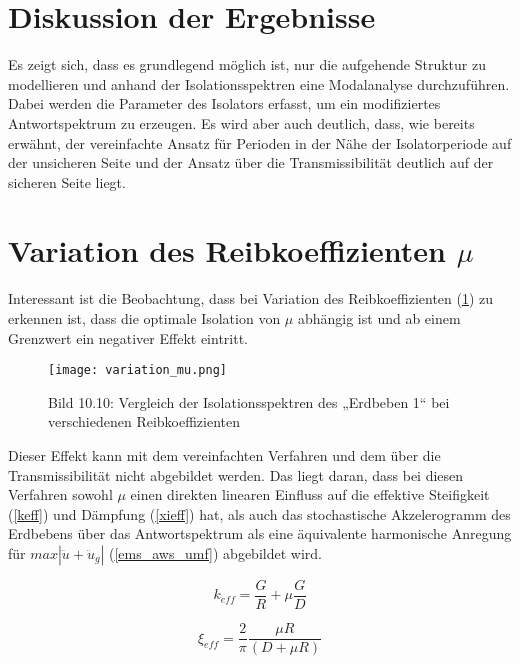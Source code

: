 \section{Diskussion der Ergebnisse}
\label{sec:diskussion}

Es zeigt sich, dass es grundlegend möglich ist, nur die aufgehende Struktur zu modellieren und anhand der Isolationsspektren eine Modalanalyse durchzuführen.
Dabei werden die Parameter des Isolators erfasst, um ein modifiziertes Antwortspektrum zu erzeugen.
Es wird aber auch deutlich, dass, wie bereits erwähnt, der vereinfachte Ansatz für Perioden in der Nähe der Isolatorperiode auf der unsicheren Seite und der Ansatz über die Transmissibilität deutlich auf der sicheren Seite liegt.

\section{Variation des Reibkoeffizienten $\mu$}
\label{sec:muvariation}

Interessant ist die Beobachtung, dass bei Variation des Reibkoeffizienten (\cref{fig:muvariation}) zu erkennen ist, dass die optimale Isolation von $\mu$ abhängig ist und ab einem Grenzwert ein negativer Effekt eintritt.

\begin{figure}[h]
    \centering
    \texttt{[image: variation\_mu.png]}
    \caption{Bild 10.10: Vergleich der Isolationsspektren des „Erdbeben 1“ bei verschiedenen Reibkoeffizienten \cite{Isemann}}
    \label{fig:muvariation}
\end{figure}

Dieser Effekt kann mit dem vereinfachten Verfahren und dem über die Transmissibilität nicht abgebildet werden. Das liegt daran, dass bei diesen Verfahren sowohl $\mu$ einen direkten linearen Einfluss auf die effektive Steifigkeit (\cref{keff}) und Dämpfung (\cref{xieff}) hat, als auch das stochastische Akzelerogramm des Erdbebens über das Antwortspektrum als eine äquivalente harmonische Anregung für $max|\ddot u + \ddot u_g|$ (\cref{ems_aws_umf}) abgebildet wird.

\begin{equation*}
k_{eff} = \frac{G}{R} + \mu \frac{G}{D}
\end{equation*}

\begin{equation*}
\xi_{eff} = \frac{2}{\pi} \frac{\mu R}{(D + \mu R)}
\end{equation*}

